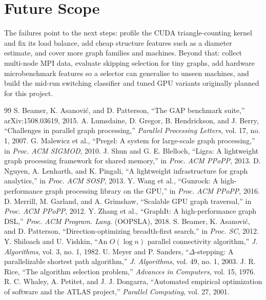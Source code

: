 \documentclass[conference]{IEEEtran}
\begin{document}
\section{Future Scope}
The failures point to the next steps: profile the CUDA triangle-counting kernel and fix its load balance, add cheap structure features such as a diameter estimate, and cover more graph families and machines. Beyond that: collect multi-node MPI data, evaluate skipping selection for tiny graphs, add hardware microbenchmark features so a selector can generalise to unseen machines, and build the mid-run switching classifier and tuned GPU variants originally planned for this project.

\begin{thebibliography}{99}
 S. Beamer, K. Asanovi\'c, and D. Patterson, ``The GAP benchmark suite,'' arXiv:1508.03619, 2015.
 A. Lumsdaine, D. Gregor, B. Hendrickson, and J. Berry, ``Challenges in parallel graph processing,'' \emph{Parallel Processing Letters}, vol. 17, no. 1, 2007.
 G. Malewicz et al., ``Pregel: A system for large-scale graph processing,'' in \emph{Proc. ACM SIGMOD}, 2010.
 J. Shun and G. E. Blelloch, ``Ligra: A lightweight graph processing framework for shared memory,'' in \emph{Proc. ACM PPoPP}, 2013.
 D. Nguyen, A. Lenharth, and K. Pingali, ``A lightweight infrastructure for graph analytics,'' in \emph{Proc. ACM SOSP}, 2013.
 Y. Wang et al., ``Gunrock: A high-performance graph processing library on the GPU,'' in \emph{Proc. ACM PPoPP}, 2016.
 D. Merrill, M. Garland, and A. Grimshaw, ``Scalable GPU graph traversal,'' in \emph{Proc. ACM PPoPP}, 2012.
 Y. Zhang et al., ``GraphIt: A high-performance graph DSL,'' \emph{Proc. ACM Program. Lang.} (OOPSLA), 2018.
 S. Beamer, K. Asanovi\'c, and D. Patterson, ``Direction-optimizing breadth-first search,'' in \emph{Proc. SC}, 2012.
 Y. Shiloach and U. Vishkin, ``An $O(\log n)$ parallel connectivity algorithm,'' \emph{J. Algorithms}, vol. 3, no. 1, 1982.
 U. Meyer and P. Sanders, ``$\Delta$-stepping: A parallelizable shortest path algorithm,'' \emph{J. Algorithms}, vol. 49, no. 1, 2003.
 J. R. Rice, ``The algorithm selection problem,'' \emph{Advances in Computers}, vol. 15, 1976.
 R. C. Whaley, A. Petitet, and J. J. Dongarra, ``Automated empirical optimization of software and the ATLAS project,'' \emph{Parallel Computing}, vol. 27, 2001.

\end{thebibliography}
\end{document}
